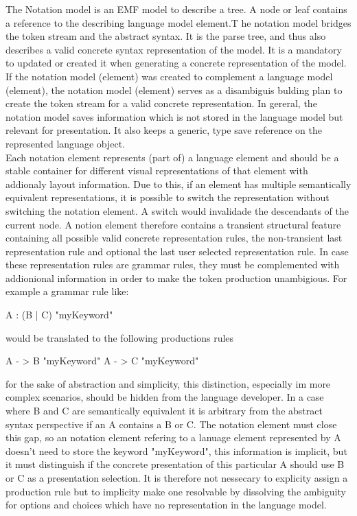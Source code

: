 The Notation model is an EMF model to describe a tree. A node or leaf contains a reference to the describing language model element.T he notation model bridges the token stream and the abstract syntax. It is the parse tree, and thus also describes a valid concrete syntax representation of the model.  It is a mandatory to updated or created it when generating a concrete representation of the model. If the notation model (element) was created to complement a language model (element), the notation model (element) serves as a disambiguis bulding plan to create the token stream for a valid concrete representation. In gereral, the notation model saves information which is not stored in the language model but relevant for presentation. It also keeps a generic, type save reference on the represented language object.\\
Each notation element represents (part of) a language element and should be a stable container for different visual representations of that element with addionaly layout information.  Due to this, if an element has multiple semantically equivalent representations, it is possible to switch the representation without switching the notation element. A switch would invalidade the descendants of the current node. A notion element therefore contains a transient structural feature containing all possible valid concrete representation rules, the non-transient last representation rule and optional the last user selected representation rule. In case these representation rules are grammar rules, they must be complemented with addionional information in order to make the token production unambigious. For example a grammar rule like:
\begin{xtxt}
A : (B | C) "myKeyword"
\end{xtxt}
would be translated to the following productions rules 
\begin{xtxt}
A - > B "myKeyword"
A - > C "myKeyword"
\end{xtxt}
for the sake of abstraction and simplicity, this distinction, especially im more complex scenarios, should be hidden from the language developer. In a case where B and C are semantically equivalent  it is arbitrary from the abstract syntax perspective if an A contains a B or C. The notation element must close this gap, so an notation element refering to a lanuage element represented by A doesn't need to store the keyword "myKeyword", this information is implicit, but it must distinguish if the concrete presentation of this particular A should use B or C as a presentation selection. It is therefore not nessecary to explicity assign  a production rule but to implicity make one resolvable by dissolving the ambiguity for options and choices which have no representation in the language model. \\
